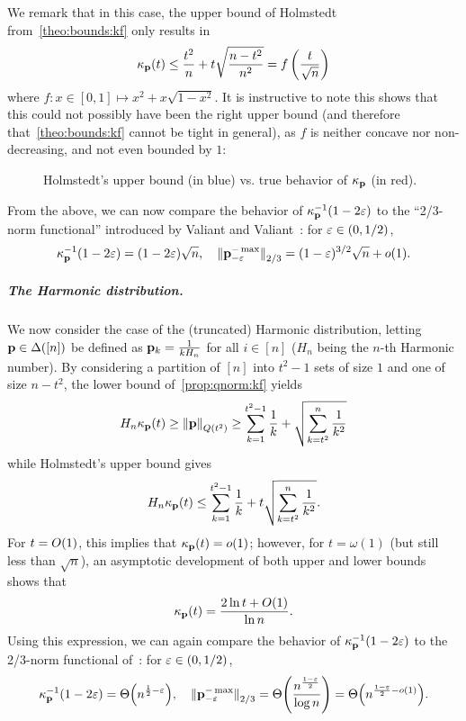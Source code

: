 We remark that in this case, the upper bound of Holmstedt from~\cref{theo:bounds:kf} only results in
\[
    \kappa_{\mathbf{p}}(t) \leq  \frac{t^2}{n} + t\sqrt{\frac{n-t^2}{n^2}}  = f\left(\frac{t}{\sqrt{n}}\right)
\]
where $f\colon x\in [0,1]\mapsto x^2+x\sqrt{1-x^2}$. It is instructive to note this shows that this could not possibly have been the right upper bound (and therefore that~\cref{theo:bounds:kf} cannot be tight in general), as $f$ is neither concave nor non-decreasing, and not even bounded by $1$:
\begin{figure}[H]\centering
  \caption{Holmstedt's upper bound (in blue) vs. true behavior of $\kappa_{\mathbf{p}}$ (in red).}
\end{figure}

From the above, we can now compare the behavior of $\kappa_{\mathbf{p}}^{-1}(1-2\varepsilon)$ to the ``2/3-norm functional'' introduced by Valiant and Valiant~\cite{VV:14}: for $\varepsilon\in(0,1/2)$,
\begin{equation}\label{eq:comparison:vv:1}
    \kf{\p}^{-1}(1-2\eps) = (1-2\eps)\sqrt{n}, \quad \norm{\p^{-\max}_{-\eps}}_{2/3} = (1-\eps)^{3/2} \sqrt{n} + \littleO{1}.
\end{equation}

\subparagraph{The Harmonic distribution.} We now consider the case of the (truncated) Harmonic distribution, letting $\mathbf{p}\in\Delta\!\left([n]\right)$ be defined as $\mathbf{p}_k = \frac{1}{k H_n}$ for all $i\in[n]$ ($H_n$ being the $n$-th Harmonic number). By considering a partition of $[n]$ into $t^2-1$ sets of size $1$ and one of size $n-t^2$, the lower bound of~\cref{prop:qnorm:kf} yields
\[
H_n \kappa_{\mathbf{p}}(t) \geq \lVert\mathbf{p}{\rVert}_{Q(t^2)} \geq \sum_{k=1}^{t^2-1} \frac{1}{k} + \sqrt{\sum_{k=t^2}^n \frac{1}{k^2}}
\]
while Holmstedt's upper bound gives
\[
H_n \kappa_{\mathbf{p}}(t) \leq \sum_{k=1}^{t^2-1} \frac{1}{k} + t\sqrt{\sum_{k=t^2}^n \frac{1}{k^2}}.
\]
For $t = \bigO{1}$, this implies that $\kf{\p}(t) = \littleO{1}$; however, for $t = \omega(1)$ (but still less than $\sqrt{n}$), an asymptotic development of both upper and lower bounds shows that
\[
    \kf{\p}(t) = \frac{2\ln t + \bigO{1}}{\ln n}.
\]
Using this expression, we can again compare the behavior of $\kappa_{\mathbf{p}}^{-1}(1-2\varepsilon)$ to the 2/3-norm functional of~\cite{VV:14}: for $\varepsilon\in(0,1/2)$,
\begin{equation}\label{eq:comparison:vv:2}
    \kf{\p}^{-1}(1-2\eps) = \bigTheta{n^{\frac{1}{2}-\eps}}, \quad \norm{\p^{-\max}_{-\eps}}_{2/3} = \bigTheta{\frac{n^{\frac{1-\eps}{2}}}{\log n}} = \bigTheta{n^{\frac{1-\eps}{2}-o(1)}}.
\end{equation}
 
